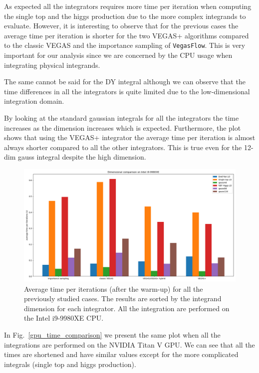 \documentclass[../main/main.tex]{subfiles}
\begin{document}
As expected all the integrators requires more time per iteration when computing the single top and the higgs production due to the more complex integrands to evaluate. However, it is interesting to observe that for the previous cases the average time per iteration is shorter for the two VEGAS+ algorithms compared to the classic VEGAS and the importance sampling of \texttt{VegasFlow}.
This is very important for our analysis since we are concerned by the CPU usage when integrating physical integrands. 

The same cannot be said for the DY integral although we can observe that the time differences in all the integrators is quite limited due to the low-dimensional integration domain.

By looking at the standard gaussian integrals for all the integrators the time increases as the dimension increases which is expected. Furthermore, the plot shows that using the VEGAS+ integrator the average time per iteration is almost always shorter compared to all the other integrators. This is true even for the 12-dim gauss integral despite the high dimension.


\begin{figure}[h]
	\centering
	\includegraphics[width=\textwidth]{../images/CPU_final.png}
	\caption{Average time per iterations (after the warm-up) for all the previously studied cases. The results are sorted by the integrand dimension for each integrator. All the integration are performed on the Intel i9-9980XE CPU. }
	\label{cpu_time_comparison}
\end{figure}

In Fig.~\ref{gpu_time_comparison} we present the same plot when all the integrations are performed on the NVIDIA Titan V GPU. We can see that all the times are shortened and have similar values except for the more complicated integrals (single top and higgs production).
\end{document}
